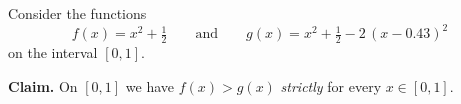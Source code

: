 \begin{problem}
Consider the functions
\[
  f(x) = x^{2} + \tfrac{1}{2}
  \qquad \text{and} \qquad
  g(x) = x^{2} + \tfrac{1}{2} - 2\,(x - 0.43)^{2}
\]
on the interval $[0, 1]$.

\textbf{Claim.} On $[0, 1]$ we have $f(x) > g(x)$ \emph{strictly}
for every $x \in [0, 1]$.
\end{problem}

